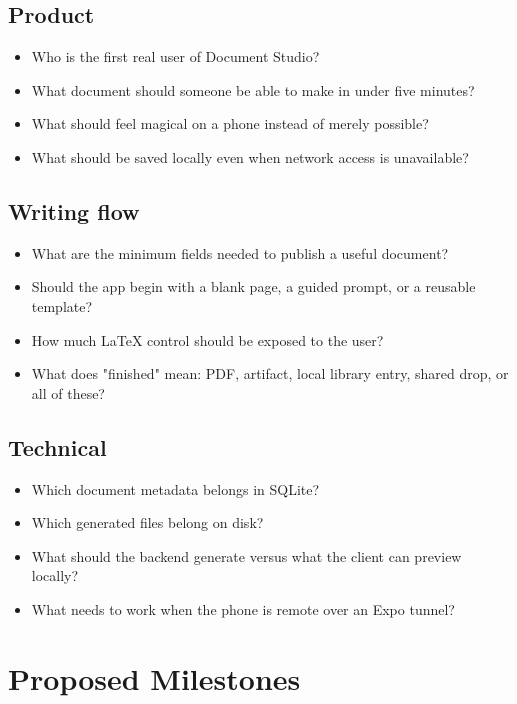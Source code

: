 \documentclass[11pt]{article}
\begin{document}
\subsection{Product}
\label{sec:org784b880}

\begin{itemize}
\item Who is the first real user of Document Studio?
\item What document should someone be able to make in under five minutes?
\item What should feel magical on a phone instead of merely possible?
\item What should be saved locally even when network access is unavailable?
\end{itemize}
\subsection{Writing flow}
\label{sec:org0d5a3e7}

\begin{itemize}
\item What are the minimum fields needed to publish a useful document?
\item Should the app begin with a blank page, a guided prompt, or a reusable template?
\item How much \LaTeX{} control should be exposed to the user?
\item What does "finished" mean: PDF, artifact, local library entry, shared drop, or all of these?
\end{itemize}
\subsection{Technical}
\label{sec:orgee1fb43}

\begin{itemize}
\item Which document metadata belongs in SQLite?
\item Which generated files belong on disk?
\item What should the backend generate versus what the client can preview locally?
\item What needs to work when the phone is remote over an Expo tunnel?
\end{itemize}
\section{Proposed Milestones}
\label{sec:org3a882f8}
\end{document}
